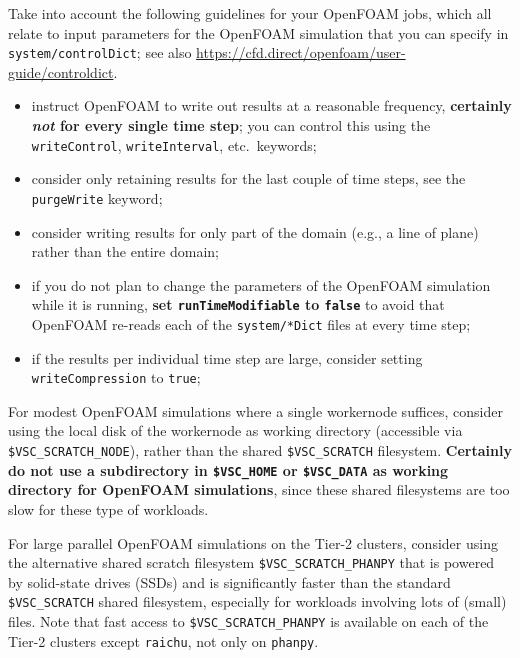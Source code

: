 Take into account the following guidelines for your OpenFOAM jobs, which all relate to input parameters
for the OpenFOAM simulation that you can specify in \texttt{\small{system/controlDict}};
see also {\small\url{https://cfd.direct/openfoam/user-guide/controldict}}.

\begin{itemize}
\item instruct OpenFOAM to write out results at a reasonable frequency, \textbf{certainly \textit{not}
for every single time step}; you can control this using the \texttt{\small{writeControl}},
\texttt{\small{writeInterval}}, etc.\ keywords;
\item consider only retaining results for the last couple of time steps, see the \texttt{\small{purgeWrite}} keyword;
\item consider writing results for only part of the domain (e.g., a line of plane) rather than the entire domain;
\item if you do not plan to change the parameters of the OpenFOAM simulation while it is running,
      \textbf{set \texttt{\small{runTimeModifiable}} to \texttt{\small{false}}} to avoid that OpenFOAM re-reads
      each of the \texttt{\small{system/*Dict}} files at every time step;
\item if the results per individual time step are large, consider setting \texttt{\small{writeCompression}} to
      \texttt{\small{true}};
\end{itemize}

For modest OpenFOAM simulations where a single workernode suffices, consider using the local disk of the
workernode as working directory (accessible via \texttt{\small{\$VSC\_SCRATCH\_NODE}}),
rather than the shared \texttt{\small{\$VSC\_SCRATCH}} filesystem. \textbf{Certainly
do not use a subdirectory in \texttt{\small{\$VSC\_HOME}} or \texttt{\small{\$VSC\_DATA}} as working directory for
OpenFOAM simulations}, since these shared filesystems are too slow for these type of workloads.

\ifgent
For large parallel OpenFOAM simulations on the \university Tier-2 clusters, consider using the
alternative shared scratch filesystem {\small\texttt{\$VSC\_SCRATCH\_PHANPY}} that is powered by
solid-state drives (SSDs) and is significantly faster than the standard {\small\texttt{\$VSC\_SCRATCH}}
shared filesystem, especially for workloads involving lots of (small) files. Note that fast access to
{\small\texttt{\$VSC\_SCRATCH\_PHANPY}} is available on each of the \university Tier-2 clusters except
{\small\texttt{raichu}}, not only on {\small\texttt{phanpy}}.
\fi

